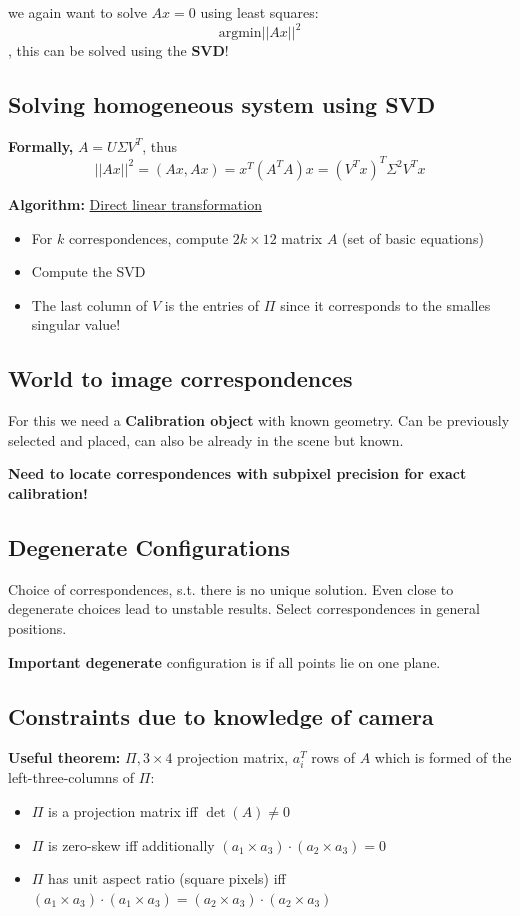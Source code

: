 we again want to solve $Ax = 0$ using least squares: $$\mathrm{argmin} || Ax ||^2$$, this can be solved using the \textbf{SVD}!

\subsection{Solving homogeneous system using SVD}

\textbf{Formally,} $A = U\Sigma V^T$, thus $$||Ax||^2 = (Ax,Ax) = x^T(A^T A) x = (V^Tx)^T \Sigma^2 V^T x$$

\textbf{Algorithm:} \underline{Direct linear transformation}

\begin{itemize}
    \item For $k$ correspondences, compute $2k \times 12$ matrix $A$ (set of basic equations)
    \item Compute the SVD
    \item The last column of $V$ is the entries of $\Pi$ since it corresponds to the smalles singular value!
\end{itemize}

\subsection{World to image correspondences}

For this we need a \textbf{Calibration object} with known geometry. Can be previously selected and placed, can also be already in the scene but known.

\textbf{Need to locate correspondences with subpixel precision for exact calibration!}

\subsection{Degenerate Configurations}

Choice of correspondences, s.t. there is no unique solution. Even close to degenerate choices lead to unstable results. Select correspondences in general positions.

\textbf{Important degenerate} configuration is if all points lie on one plane. 

\subsection{Constraints due to knowledge of camera}

\textbf{Useful theorem:} $\Pi , 3\times 4$ projection matrix, $a_i^T$ rows of $A$ which is formed of the left-three-columns of $\Pi$: \begin{itemize}
    \item $\Pi$ is a projection matrix iff $\det(A) \neq 0$
    \item $\Pi$ is zero-skew iff additionally $(a_1 \times a_3) \cdot (a_2 \times a_3) = 0$
    \item $\Pi$ has unit aspect ratio (square pixels) iff $(a_1 \times a_3) \cdot (a_1 \times a_3) = (a_2 \times a_3) \cdot (a_2 \times a_3)$
\end{itemize}